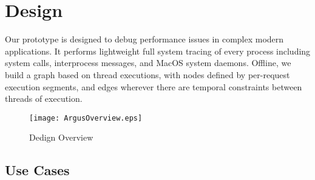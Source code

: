 \section{Design}
\label{sec:design}

Our \xxx prototype is designed to debug performance issues in complex modern applications.
It performs lightweight full system tracing of every process including system calls, interprocess messages, and MacOS system daemons.
Offline, we build a graph based on thread executions, with nodes defined by per-request execution segments, and edges wherever there are temporal constraints between threads of execution.

\begin{figure*}[tb]
    \centering
    \texttt{[image: ArgusOverview.eps]}
    \caption{Dedign Overview}
    \label{fig:argus-overview}
\end{figure*}

\subsection{Use Cases}

